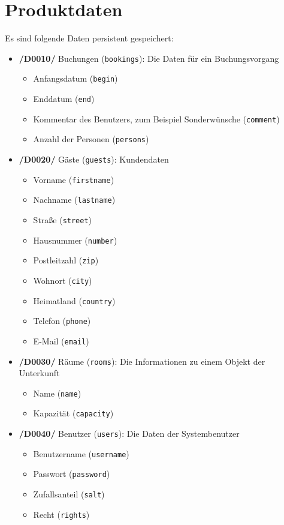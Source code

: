 \documentclass[a4paper,oneside]{scrreprt}
\begin{document}
\chapter{Produktdaten}
Es sind folgende Daten persistent gespeichert:

\begin{itemize}
\item \textbf{/D0010/} Buchungen (\texttt{bookings}): Die Daten für ein Buchungsvorgang
    \begin{itemize}
    \item Anfangsdatum (\texttt{begin})
    \item Enddatum (\texttt{end})
    \item Kommentar des Benutzers, zum Beispiel Sonderwünsche (\texttt{comment})
    \item Anzahl der Personen (\texttt{persons})
    \end{itemize}

\item \textbf{/D0020/} Gäste (\texttt{guests}): Kundendaten
    \begin{itemize}
    \item Vorname (\texttt{firstname})
    \item Nachname (\texttt{lastname})
    \item Straße (\texttt{street})
    \item Hausnummer (\texttt{number})
    \item Postleitzahl (\texttt{zip})
    \item Wohnort (\texttt{city})
    \item Heimatland (\texttt{country})
    \item Telefon (\texttt{phone})
    \item E-Mail (\texttt{email})
    \end{itemize}

\item \textbf{/D0030/} Räume (\texttt{rooms}): Die Informationen zu einem Objekt der Unterkunft
    \begin{itemize}
    \item Name (\texttt{name})
    \item Kapazität (\texttt{capacity})
    \end{itemize}

\item \textbf{/D0040/} Benutzer (\texttt{users}): Die Daten der Systembenutzer
    \begin{itemize}
    \item Benutzername (\texttt{username})
    \item Passwort (\texttt{password})
    \item Zufallsanteil (\texttt{salt})
    \item Recht (\texttt{rights})
    \end{itemize}
\end{itemize}
\end{document}
